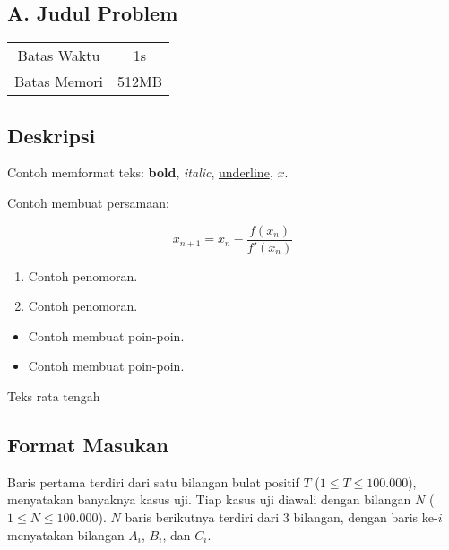 \documentclass{article}
\begin{document}
\begin{center}
    \section*{A. Judul Problem} %

    \begin{tabular}{ | c c | }
        \hline
        Batas Waktu  & 1s \\    %
        Batas Memori & 512MB \\  %
        \hline
    \end{tabular}
\end{center}

\subsection*{Deskripsi}

Contoh memformat teks: \textbf{bold}, \textit{italic}, \underline{underline}, $x$.

Contoh membuat persamaan:

\[ x_{n+1} = x_{n} - \frac{f(x_{n})}{f'(x_{n})} \]

\begin{enumerate}
    \setlength\itemsep{0pt}
    \item Contoh penomoran.
    \item Contoh penomoran.
\end{enumerate}

\begin{itemize}
    \setlength\itemsep{0pt}
    \item Contoh membuat poin-poin.
    \item Contoh membuat poin-poin.
\end{itemize}

\begin{center}
    Teks rata tengah
\end{center}

\subsection*{Format Masukan}

Baris pertama terdiri dari satu bilangan bulat positif $T$ ($1 \leq T \leq 100.000$), menyatakan banyaknya kasus uji.
Tiap kasus uji diawali dengan bilangan $N$ ($1 \leq N \leq 100.000$).
$N$ baris berikutnya terdiri dari 3 bilangan, dengan baris ke-$i$ menyatakan bilangan $A_i$, $B_i$, dan $C_i$.
\end{document}
